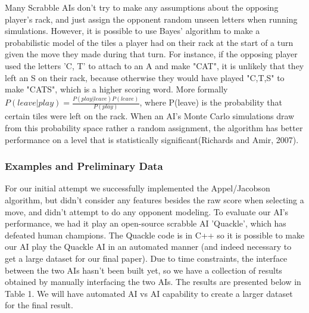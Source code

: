 \documentclass[12pt]{article}
\begin{document}
Many Scrabble AIs don't try to make any assumptions about the opposing
player's rack, and just assign the opponent random unseen letters when
running simulations. However, it is possible to use Bayes' algorithm
to make a probabilistic model of the tiles a player had on their rack
at the start of a turn given the move they made during that turn.%
For instance, if the opposing player used the letters 'C, T' to attach
to an A and make "CAT", it is unlikely that they left an S on their
rack, because otherwise they would have played "C,T,S" to make "CATS",
which is a higher scoring word. More formally $P(leave | play) =
\frac{P(play | leave)P(leave)}{P(play)}$, where P(leave) is the
probability that certain tiles were left on the rack. When an AI's
Monte Carlo simulations draw from this probability space rather a
random assignment, the algorithm has better performance on a level
that is statistically significant(Richards and Amir, 2007).

	



\subsubsection*{Examples and Preliminary Data}
For our initial attempt we successfully implemented the Appel/Jacobson
algorithm, but didn't consider any features besides the raw score when
selecting a move, and didn't attempt to do any opponent modeling.  To
evaluate our AI's performance, we had it play an open-source scrabble
AI 'Quackle', which has defeated human champions. The Quackle code is
in C++ so it is possible to make our AI play the Quackle AI in an
automated manner (and indeed necessary to get a large dataset for our
final paper). Due to time constraints, the interface between the two
AIs hasn't been built yet, so we have a collection of results obtained
by manually interfacing the two AIs.  The results are presented below
in Table 1.  We will have automated AI vs AI capability to create a
larger dataset for the final result. \\
\end{document}
